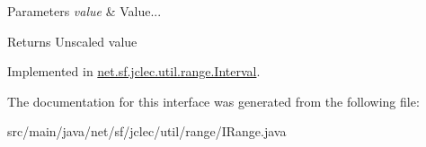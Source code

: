 \begin{DoxyParams}{Parameters}
{\em value} & Value...\\
\hline
\end{DoxyParams}
\begin{DoxyReturn}{Returns}
Unscaled value 
\end{DoxyReturn}


Implemented in \hyperlink{classnet_1_1sf_1_1jclec_1_1util_1_1range_1_1_interval_a8075df146f02571b4540db5cc81c2f20}{net.\-sf.\-jclec.\-util.\-range.\-Interval}.



The documentation for this interface was generated from the following file\-:\begin{DoxyCompactItemize}
\item 
src/main/java/net/sf/jclec/util/range/I\-Range.\-java\end{DoxyCompactItemize}

